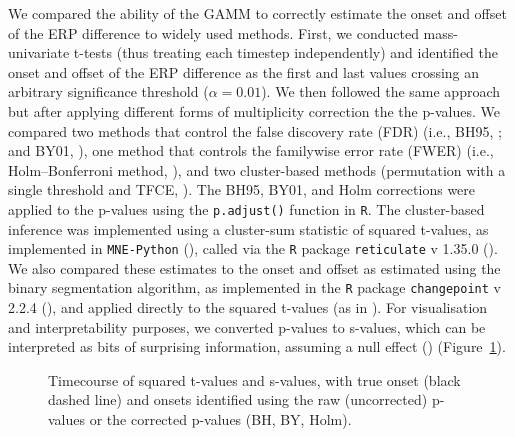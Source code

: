 \documentclass[
  doc,
  floatsintext,
  longtable,
  a4paper,
  nolmodern,
  notxfonts,
  notimes,
  colorlinks=true,linkcolor=blue,citecolor=blue,urlcolor=blue]{apa7}
\begin{document}
We compared the ability of the GAMM to correctly estimate the onset and
offset of the ERP difference to widely used methods. First, we conducted
mass-univariate t-tests (thus treating each timestep independently) and
identified the onset and offset of the ERP difference as the first and
last values crossing an arbitrary significance threshold
(\(\alpha = 0.01\)). We then followed the same approach but after
applying different forms of multiplicity correction the the p-values. We
compared two methods that control the false discovery rate (FDR) (i.e.,
BH95, ; and
BY01, ), one
method that controls the familywise error rate (FWER) (i.e.,
Holm--Bonferroni method, ), and two
cluster-based methods (permutation with a single threshold and TFCE,
). The BH95, BY01, and
Holm corrections were applied to the p-values using the
\texttt{p.adjust()} function in \texttt{R}. The cluster-based inference
was implemented using a cluster-sum statistic of squared t-values, as
implemented in \texttt{MNE-Python}
(), called via the \texttt{R}
package \texttt{reticulate} v 1.35.0 (). We also compared these estimates to the onset and offset as
estimated using the binary segmentation algorithm, as implemented in the
\texttt{R} package \texttt{changepoint} v 2.2.4
(), and applied
directly to the squared t-values (as in
). For visualisation
and interpretability purposes, we converted p-values to s-values, which
can be interpreted as bits of surprising information, assuming a null
effect ()
(Figure~\ref{fig-corrections}).

\begin{figure}[!htb]

\caption{\label{fig-corrections}Timecourse of squared t-values and
s-values, with true onset (black dashed line) and onsets identified
using the raw (uncorrected) p-values or the corrected p-values (BH, BY,
Holm).}


\end{figure}%
\end{document}
